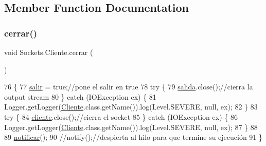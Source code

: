 \subsection{Member Function Documentation}
\mbox{\label{class_sockets_1_1_cliente_a97cefc10f0737a0e35a923d895b24b30}} 
\subsubsection{\texorpdfstring{cerrar()}{cerrar()}}
{\footnotesize\ttfamily void Sockets.\+Cliente.\+cerrar (\begin{DoxyParamCaption}{ }\end{DoxyParamCaption})\hspace{0.3cm}{\ttfamily [inline]}}


\begin{DoxyCode}
76     \{
77         \mbox{\hyperlink{class_sockets_1_1_cliente_ab72910fbf98a6c65607aeb382526389a}{salir}} = \textcolor{keyword}{true};\textcolor{comment}{//pone el salir en true}
78         \textcolor{keywordflow}{try} \{
79             \mbox{\hyperlink{class_sockets_1_1_cliente_a0e85d127bffa834dc946bb2c39a8a7a2}{salida}}.close();\textcolor{comment}{//cierra la output stream}
80         \} \textcolor{keywordflow}{catch} (IOException ex) \{
81             Logger.getLogger(\mbox{\hyperlink{class_sockets_1_1_cliente_ab3aed9d5de2bafbb190c27a9c5e7cfd1}{Cliente}}.class.getName()).log(Level.SEVERE, null, ex);
82         \}
83         \textcolor{keywordflow}{try} \{
84             \mbox{\hyperlink{class_sockets_1_1_cliente_afe26e0d4cbe42f094ce76f958e15fb58}{cliente}}.close();\textcolor{comment}{//cierra el socket}
85         \} \textcolor{keywordflow}{catch} (IOException ex) \{
86             Logger.getLogger(\mbox{\hyperlink{class_sockets_1_1_cliente_ab3aed9d5de2bafbb190c27a9c5e7cfd1}{Cliente}}.class.getName()).log(Level.SEVERE, null, ex);
87         \}
88         
89         \mbox{\hyperlink{class_sockets_1_1_cliente_a8c72e0702477bfa5ab697ed20fb0a490}{notificar}}();
90         \textcolor{comment}{//notify();//despierta al hilo para que termine su ejecución}
91     \}
\end{DoxyCode}
\mbox{\label{class_sockets_1_1_cliente_ad771c3e62e58392ade4f7cddb361bf05}} 
